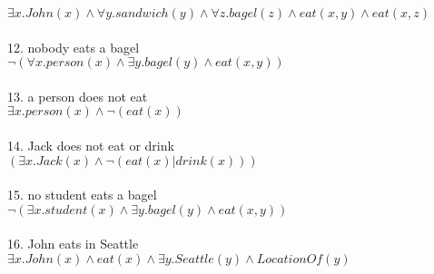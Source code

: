 \documentclass[11pt]{article}
\begin{document}
$\exists x.John(x) \wedge \forall y.sandwich(y) \wedge \forall z.bagel(z) \wedge eat(x,y) \wedge eat(x,z)$ \\ \\
12. nobody eats a bagel \\
$\neg (\forall x.person(x) \wedge \exists y.bagel(y) \wedge eat(x,y))$ \\ \\
13. a person does not eat \\
$\exists x.person(x) \wedge \neg (eat(x))$ \\ \\
14. Jack does not eat or drink \\
$(\exists x.Jack(x) \wedge \neg (eat(x) | drink(x)))$ \\ \\
15. no student eats a bagel \\
$\neg (\exists x.student(x) \wedge \exists y.bagel(y) \wedge eat(x, y))$ \\ \\
16. John eats in Seattle \\
$\exists x.John(x) \wedge eat(x) \wedge \exists y.Seattle(y) \wedge LocationOf(y)$
\end{document}
